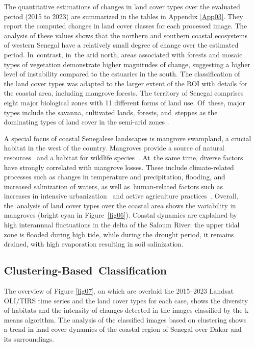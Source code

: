 \documentclass[earth,article,accept,pdftex,moreauthors]{Definitions/mdpi}
\begin{document}
{The quantitative estimations of changes in land cover types over the evaluated period (2015 to 2023) are summarized in the tables in Appendix \ref{App03}{. }They report the computed changes in land cover classes for each processed image. {The analysis of these values shows that the northern and southern coastal ecosystems of western Senegal have a relatively small{ degree of change }over the estimated period. In~contrast, in~the arid north, areas associated with forests and mosaic types of vegetation demonstrate higher magnitudes of change, suggesting a higher {level of }instability compared to {the }estuaries in the south{.}} {The} classification of the land cover types was adapted to the larger extent of the {ROI} with details for the coastal area, {including} mangrove forests. {The} territory of Senegal{ }comprises eight major biological zones with 11 different forms of land use. Of~these, major{ }types{ }include the {savanna}, cultivated lands, forests, and~steppes{ }as the dominating types of land cover {in the semi-arid zones }\cite{WOOMER2004625}. 

A special focus of {coastal Senegalese landscapes is} mangrove swampland, a crucial {habitat} {in the west of the country}{. Mangroves provide }a source of natural resources~\cite{Carney} and a habitat for {wildlife }species~\cite{Galat}. At~the same time, diverse factors have strongly correlated with mangrove losses. These include climate-related processes such as changes in temperature and precipitation, flooding, and increased salinization of waters, as well as~human-related factors such as increases in intensive urbanization~\cite{land10100996} and active agriculture practices~\cite{Branoff}. Overall, the~analysis of land cover types over the coastal area shows the variability in mangroves ({bright} cyan in Figure~\ref{fig06}){. Coastal dynamics }are explained by{ }high interannual fluctuations in the delta of the Saloum River{:} the upper tidal zone is flooded during  high tide{, while }during the drought period, {it} remains drained, with {high evaporation resulting in soil} salinization. 

\subsection{{Clustering-Based~Classification}}

{The overview of Figure} \ref{fig07}, {on which are overlaid the 2015--2023 Landsat OLI/TIRS time series and the land cover %
types for each{ }case, shows the diversity of habitats and {the }intensity of changes {detected} in the images classified by the k-means algorithm.} The analysis of the classified images {based on clustering}{ }shows a trend in land cover dynamics of the coastal region of Senegal over Dakar and {its surroundings}. 

}
\end{document}
